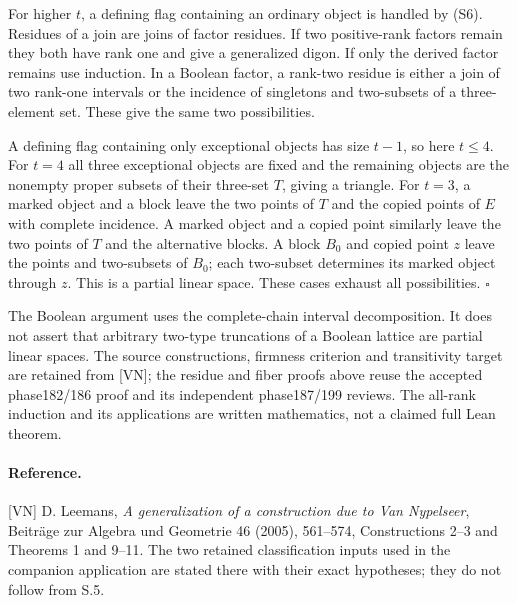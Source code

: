 For higher $t$, a defining flag containing an ordinary object is
handled by (S6). Residues of a join are joins of factor residues.
If two positive-rank factors remain they both have rank one and
give a generalized digon. If only the derived factor remains use
induction. In a Boolean factor, a rank-two residue is either a
join of two rank-one intervals or the incidence of singletons and
two-subsets of a three-element set. These give the same two possibilities.

A defining flag containing only exceptional objects has size $t-1$,
so here $t\leq4$. For $t=4$ all three exceptional objects are
fixed and the remaining objects are the nonempty proper subsets
of their three-set $T$, giving a triangle. For $t=3$, a marked
object and a block leave the two points of $T$ and the copied points
of $E$ with complete incidence. A marked object and a copied point
similarly leave the two points of $T$ and the alternative blocks.
A block $B_0$ and copied point $z$ leave the points and two-subsets
of $B_0$; each two-subset determines its marked object through $z$.
This is a partial linear space. These cases exhaust all possibilities.
\hfill$\square$

The Boolean argument uses the complete-chain interval decomposition.
It does not assert that arbitrary two-type truncations of a Boolean
lattice are partial linear spaces. The source constructions, firmness
criterion and transitivity target are retained from [VN]; the residue
and fiber proofs above reuse the accepted phase182/186 proof and its
independent phase187/199 reviews. The all-rank induction and its
applications are written mathematics, not a claimed full Lean theorem.

\paragraph{Reference.}
[VN] D. Leemans, \emph{A generalization of a construction due to Van
Nypelseer}, Beitr\"age zur Algebra und Geometrie 46 (2005), 561--574,
Constructions 2--3 and Theorems 1 and 9--11. The two retained
classification inputs used in the companion application are stated
there with their exact hypotheses; they do not follow from S.5.
